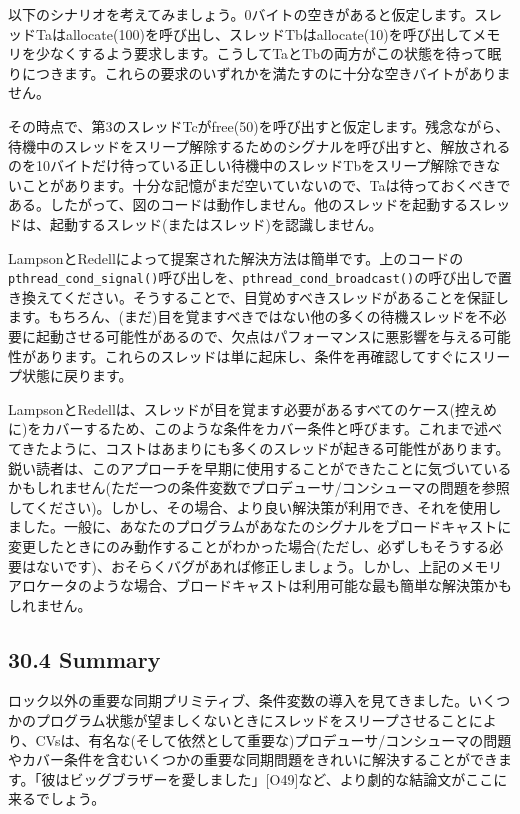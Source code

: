 以下のシナリオを考えてみましょう。0バイトの空きがあると仮定します。スレッドTaはallocate(100)を呼び出し、スレッドTbはallocate(10)を呼び出してメモリを少なくするよう要求します。こうしてTaとTbの両方がこの状態を待って眠りにつきます。これらの要求のいずれかを満たすのに十分な空きバイトがありません。

その時点で、第3のスレッドTcがfree(50)を呼び出すと仮定します。残念ながら、待機中のスレッドをスリープ解除するためのシグナルを呼び出すと、解放されるのを10バイトだけ待っている正しい待機中のスレッドTbをスリープ解除できないことがあります。十分な記憶がまだ空いていないので、Taは待っておくべきである。したがって、図のコードは動作しません。他のスレッドを起動するスレッドは、起動するスレッド(またはスレッド)を認識しません。

LampsonとRedellによって提案された解決方法は簡単です。上のコードの\texttt{pthread\_cond\_signal()}呼び出しを、\texttt{pthread\_cond\_broadcast()}の呼び出しで置き換えてください。そうすることで、目覚めすべきスレッドがあることを保証します。もちろん、(まだ)目を覚ますべきではない他の多くの待機スレッドを不必要に起動させる可能性があるので、欠点はパフォーマンスに悪影響を与える可能性があります。これらのスレッドは単に起床し、条件を再確認してすぐにスリープ状態に戻ります。

LampsonとRedellは、スレッドが目を覚ます必要があるすべてのケース(控えめに)をカバーするため、このような条件をカバー条件と呼びます。これまで述べてきたように、コストはあまりにも多くのスレッドが起きる可能性があります。鋭い読者は、このアプローチを早期に使用することができたことに気づいているかもしれません(ただ一つの条件変数でプロデューサ/コンシューマの問題を参照してください)。しかし、その場合、より良い解決策が利用でき、それを使用しました。一般に、あなたのプログラムがあなたのシグナルをブロードキャストに変更したときにのみ動作することがわかった場合(ただし、必ずしもそうする必要はないです)、おそらくバグがあれば修正しましょう。しかし、上記のメモリアロケータのような場合、ブロードキャストは利用可能な最も簡単な解決策かもしれません。

\hypertarget{summary-19}{%
\subsection*{30.4 Summary}\label{summary-19}}

ロック以外の重要な同期プリミティブ、条件変数の導入を見てきました。いくつかのプログラム状態が望ましくないときにスレッドをスリープさせることにより、CVsは、有名な(そして依然として重要な)プロデューサ/コンシューマの問題やカバー条件を含むいくつかの重要な同期問題をきれいに解決することができます。「彼はビッグブラザーを愛しました」{[}O49{]}など、より劇的な結論文がここに来るでしょう。

